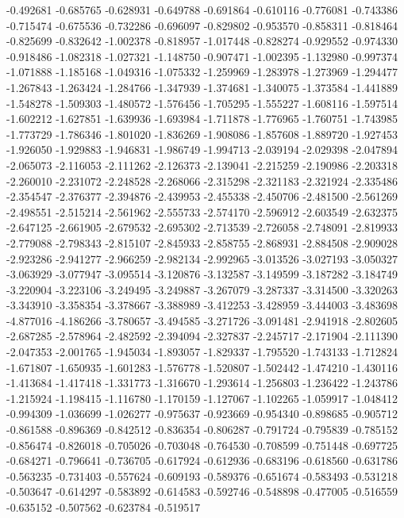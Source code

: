 -0.492681
-0.685765
-0.628931
-0.649788
-0.691864
-0.610116
-0.776081
-0.743386
-0.715474
-0.675536
-0.732286
-0.696097
-0.829802
-0.953570
-0.858311
-0.818464
-0.825699
-0.832642
-1.002378
-0.818957
-1.017448
-0.828274
-0.929552
-0.974330
-0.918486
-1.082318
-1.027321
-1.148750
-0.907471
-1.002395
-1.132980
-0.997374
-1.071888
-1.185168
-1.049316
-1.075332
-1.259969
-1.283978
-1.273969
-1.294477
-1.267843
-1.263424
-1.284766
-1.347939
-1.374681
-1.340075
-1.373584
-1.441889
-1.548278
-1.509303
-1.480572
-1.576456
-1.705295
-1.555227
-1.608116
-1.597514
-1.602212
-1.627851
-1.639936
-1.693984
-1.711878
-1.776965
-1.760751
-1.743985
-1.773729
-1.786346
-1.801020
-1.836269
-1.908086
-1.857608
-1.889720
-1.927453
-1.926050
-1.929883
-1.946831
-1.986749
-1.994713
-2.039194
-2.029398
-2.047894
-2.065073
-2.116053
-2.111262
-2.126373
-2.139041
-2.215259
-2.190986
-2.203318
-2.260010
-2.231072
-2.248528
-2.268066
-2.315298
-2.321183
-2.321924
-2.335486
-2.354547
-2.376377
-2.394876
-2.439953
-2.455338
-2.450706
-2.481500
-2.561269
-2.498551
-2.515214
-2.561962
-2.555733
-2.574170
-2.596912
-2.603549
-2.632375
-2.647125
-2.661905
-2.679532
-2.695302
-2.713539
-2.726058
-2.748091
-2.819933
-2.779088
-2.798343
-2.815107
-2.845933
-2.858755
-2.868931
-2.884508
-2.909028
-2.923286
-2.941277
-2.966259
-2.982134
-2.992965
-3.013526
-3.027193
-3.050327
-3.063929
-3.077947
-3.095514
-3.120876
-3.132587
-3.149599
-3.187282
-3.184749
-3.220904
-3.223106
-3.249495
-3.249887
-3.267079
-3.287337
-3.314500
-3.320263
-3.343910
-3.358354
-3.378667
-3.388989
-3.412253
-3.428959
-3.444003
-3.483698
-4.877016
-4.186266
-3.780657
-3.494585
-3.271726
-3.091481
-2.941918
-2.802605
-2.687285
-2.578964
-2.482592
-2.394094
-2.327837
-2.245717
-2.171904
-2.111390
-2.047353
-2.001765
-1.945034
-1.893057
-1.829337
-1.795520
-1.743133
-1.712824
-1.671807
-1.650935
-1.601283
-1.576778
-1.520807
-1.502442
-1.474210
-1.430116
-1.413684
-1.417418
-1.331773
-1.316670
-1.293614
-1.256803
-1.236422
-1.243786
-1.215924
-1.198415
-1.116780
-1.170159
-1.127067
-1.102265
-1.059917
-1.048412
-0.994309
-1.036699
-1.026277
-0.975637
-0.923669
-0.954340
-0.898685
-0.905712
-0.861588
-0.896369
-0.842512
-0.836354
-0.806287
-0.791724
-0.795839
-0.785152
-0.856474
-0.826018
-0.705026
-0.703048
-0.764530
-0.708599
-0.751448
-0.697725
-0.684271
-0.796641
-0.736705
-0.617924
-0.612936
-0.683196
-0.618560
-0.631786
-0.563235
-0.731403
-0.557624
-0.609193
-0.589376
-0.651674
-0.583493
-0.531218
-0.503647
-0.614297
-0.583892
-0.614583
-0.592746
-0.548898
-0.477005
-0.516559
-0.635152
-0.507562
-0.623784
-0.519517
